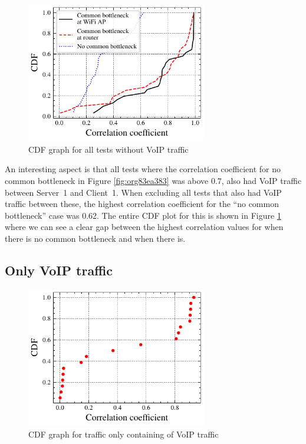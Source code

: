 \documentclass[a4paper,11pt]{article}
\begin{document}
\begin{figure}[htbp]
\centering
\includegraphics[width=0.7\textwidth]{figures/results/all-over2-no-video.pdf}
\caption{\label{fig:orged3ef23}CDF graph for all tests without VoIP traffic}
\end{figure}

An interesting aspect is that all tests where the correlation coefficient for no common bottleneck in Figure \ref{fig:org83ea383} was above 0.7, also had VoIP traffic between Server~1 and Client~1. When excluding all tests that also had VoIP traffic between these, the highest correlation coefficient for the ``no common bottleneck'' case was 0.62. The entire CDF plot for this is shown in Figure \ref{fig:orged3ef23} where we can see a clear gap between the highest correlation values for when there is no common bottleneck and when there is.
\subsection{Only VoIP traffic}
\label{sec:org8424599}
\begin{figure}[htbp]
\centering
\includegraphics[width=0.7\textwidth]{figures/results/only-video-combined.pdf}
\caption{\label{fig:orgbdcff89}CDF graph for traffic only containing of VoIP traffic}
\end{figure}
\end{document}
